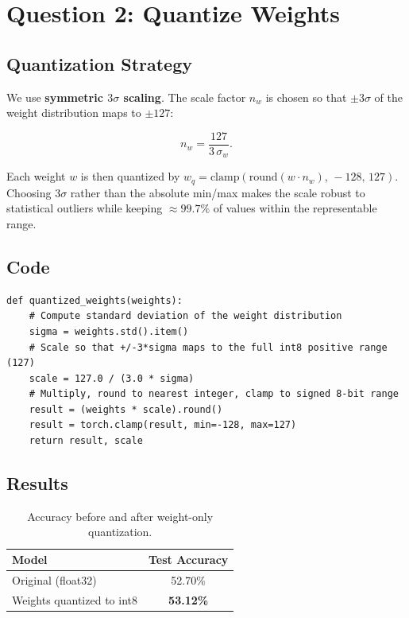 \documentclass[11pt, letterpaper]{article}
\begin{document}
\section{Question 2: Quantize Weights}

\subsection{Quantization Strategy}

We use \textbf{symmetric $3\sigma$ scaling}. The scale factor $n_w$ is
chosen so that $\pm3\sigma$ of the weight distribution maps to $\pm127$:

\begin{equation}
  n_w = \frac{127}{3\,\sigma_w}.
  \label{eq:weight_scale}
\end{equation}

Each weight $w$ is then quantized by
$w_q = \mathrm{clamp}(\mathrm{round}(w \cdot n_w),\, -128,\, 127).$
Choosing $3\sigma$ rather than the absolute min/max makes the scale robust
to statistical outliers while keeping ${\approx}99.7\%$ of values within
the representable range.

\subsection{Code}

\begin{lstlisting}[caption={Weight quantization --- \texttt{quantized\_weights}.}]
def quantized_weights(weights):
    # Compute standard deviation of the weight distribution
    sigma = weights.std().item()
    # Scale so that +/-3*sigma maps to the full int8 positive range (127)
    scale = 127.0 / (3.0 * sigma)
    # Multiply, round to nearest integer, clamp to signed 8-bit range
    result = (weights * scale).round()
    result = torch.clamp(result, min=-128, max=127)
    return result, scale
\end{lstlisting}

\subsection{Results}

\begin{table}[H]
  \centering
  \caption{Accuracy before and after weight-only quantization.}
  \begin{tabular}{lc}
    \toprule
    \textbf{Model}                    & \textbf{Test Accuracy} \\
    \midrule
    Original (float32)                & 52.70\%                \\
    Weights quantized to int8         & \textbf{53.12\%}       \\
    \bottomrule
  \end{tabular}
\end{table}
\end{document}
